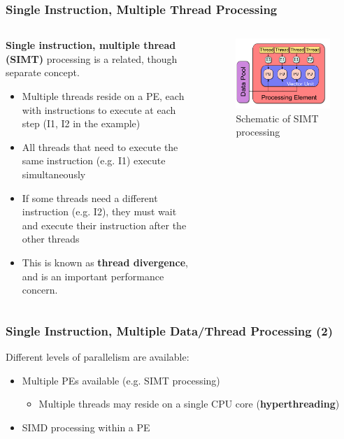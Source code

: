 \documentclass{beamer}
\begin{document}
\begin{frame}
 \frametitle{Single Instruction, Multiple Thread Processing}
 \begin{columns}
 \begin{column}{0.6\textwidth}
 \textbf{Single instruction, multiple thread (SIMT)} processing is a related, though separate concept.
 \begin{itemize}
  \item Multiple threads reside on a PE, each with instructions to execute at each step (\textrm{I1}, \textrm{I2} in the example)
  \item All threads that need to execute the same instruction (e.g. \textrm{I1}) execute simultaneously
  \item If some threads need a different instruction (e.g. \textrm{I2}), they must wait and execute their instruction after the other threads
  \item This is known as \textbf{thread divergence}, and is an important performance concern.
 \end{itemize}

  
 \end{column}
 \begin{column}{0.4\textwidth}
  \begin{figure}[r]
    \centering
    \includegraphics[width=\columnwidth]{SIMT.pdf}
    \caption{Schematic of SIMT processing}
  \end{figure}
 \end{column}
 \end{columns}
\end{frame}

    
\begin{frame}
 \frametitle{Single Instruction, Multiple Data\slash Thread Processing (2)}
 Different levels of parallelism are available:
 \begin{itemize}
  \item Multiple PEs available (e.g. SIMT processing)
  \begin{itemize}
   \item Multiple threads may reside on a single CPU core (\textbf{hyperthreading})
  \end{itemize}
  \item SIMD processing within a PE
 \end{itemize}
\end{frame}
\end{document}
